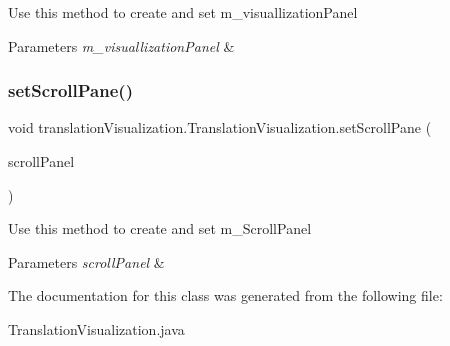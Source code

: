 Use this method to create and set m\+\_\+visuallization\+Panel


\begin{DoxyParams}{Parameters}
{\em m\+\_\+visuallization\+Panel} & \\
\hline
\end{DoxyParams}
\mbox{\label{classtranslation_visualization_1_1_translation_visualization_aa47fe2442c918ddf07a4d652aa452c2e}} 
\subsubsection{\texorpdfstring{set\+Scroll\+Pane()}{setScrollPane()}}
{\footnotesize\ttfamily void translation\+Visualization.\+Translation\+Visualization.\+set\+Scroll\+Pane (\begin{DoxyParamCaption}\item[{J\+Scroll\+Pane}]{scroll\+Panel }\end{DoxyParamCaption})\hspace{0.3cm}{\ttfamily [inline]}}

Use this method to create and set m\+\_\+\+Scroll\+Panel


\begin{DoxyParams}{Parameters}
{\em scroll\+Panel} & \\
\hline
\end{DoxyParams}


The documentation for this class was generated from the following file\+:\begin{DoxyCompactItemize}
\item 
Translation\+Visualization.\+java\end{DoxyCompactItemize}
